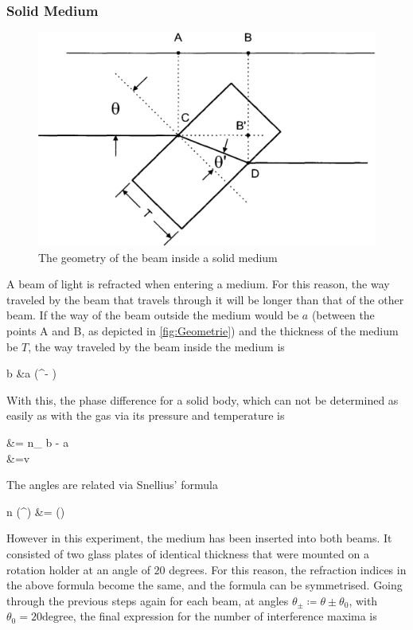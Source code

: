 \subsubsection{Solid Medium}
\begin{figure}
\includegraphics[width=\linewidth]{./figures/glasplaettchen.pdf}
\caption{The geometry of the beam inside a solid medium}
\label{fig:Geometrie}
\end{figure}
A beam of light is refracted when entering a medium. For this reason, the way traveled by the beam that travels through it will be longer than that of the other beam. If the way of the beam outside the medium would be $a$ (between the points A and B, as depicted in \autoref{fig:Geometrie}) and the thickness of the medium be $T$, the way traveled by the beam inside the medium is 
\begin{aquation}
  b &\coloneqq a \cos(\theta^\prime - \theta) \tp
\end{aquation}
With this, the phase difference for a solid body, which can not be determined as easily as with the gas via its pressure and temperature is
\begin{aquation}
\label{eq:phase-difference_solid}
  \Delta \varphi &=  \lbr n_ b - a \rbr \\
  		&=v  \lbr {}\rbr \tp
\end{aquation}
The angles are related via Snellius' formula
\begin{aquation}
  n \sin(\theta^\prime) &= \sin(\theta) \tp
\end{aquation}
However in this experiment, the medium has been inserted into both beams. It consisted of two glass plates of identical thickness that were mounted on a rotation holder at an angle of $20$ degrees. For this reason, the refraction indices in the above formula become the same, and the formula can be symmetrised. Going through the previous steps again for each beam, at angles $\theta_\pm \coloneqq \theta \pm \theta_0$, with $\theta_0 = 20 \text{degree}$, the final expression for the number of interference maxima is 
